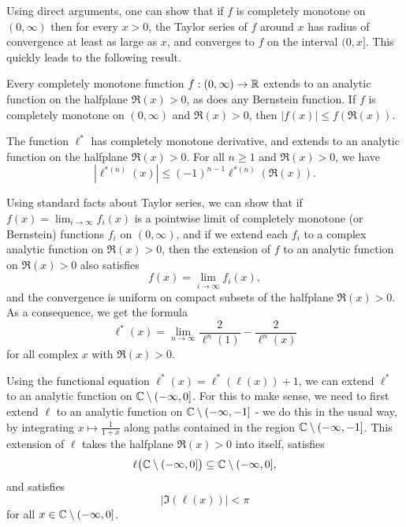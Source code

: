 \documentclass[letterpaper,11pt]{article}
\begin{document}
Using direct arguments, one can show that if $f$ is completely monotone on $(0,\infty)$ then for every $x > 0$, the Taylor series of $f$ around $x$ has radius of convergence at least as large as $x$, and converges to $f$ on the interval $(0,x]$. This quickly leads to the following result.

\begin{prop} Every completely monotone function $f : (0,\infty) \rightarrow \mathbb{R}$ extends to an analytic function on the halfplane $\Re(x) > 0$, as does any Bernstein function. If $f$ is completely monotone on $(0,\infty)$ and $\Re(x) > 0$, then $|f(x)| \le f(\Re(x))$.
\end{prop}

\begin{cor} The function $\ell^*$ has completely monotone derivative, and extends to an analytic function on the halfplane $\Re(x) > 0$. For all $n \ge 1$ and $\Re(x) > 0$, we have
\[
|\ell^{*(n)}(x)| \le (-1)^{n-1}\ell^{*(n)}(\Re(x)).
\]
\end{cor}

Using standard facts about Taylor series, we can show that if $f(x) = \lim_{i\rightarrow \infty} f_i(x)$ is a pointwise limit of completely monotone (or Bernstein) functions $f_i$ on $(0,\infty)$, and if we extend each $f_i$ to a complex analytic function on $\Re(x) > 0$, then the extension of $f$ to an analytic function on $\Re(x) > 0$ also satisfies
\[
f(x) = \lim_{i\rightarrow \infty} f_i(x),
\]
and the convergence is uniform on compact subsets of the halfplane $\Re(x) > 0$. As a consequence, we get the formula
\[
\ell^*(x) = \lim_{n\rightarrow \infty} \frac{2}{\ell^n(1)} - \frac{2}{\ell^n(x)}
\]
for all complex $x$ with $\Re(x) > 0$.

Using the functional equation $\ell^*(x) = \ell^*(\ell(x)) + 1$, we can extend $\ell^*$ to an analytic function on $\mathbb{C} \setminus (-\infty,0]$. For this to make sense, we need to first extend $\ell$ to an analytic function on $\mathbb{C}\setminus(-\infty,-1]$ - we do this in the usual way, by integrating $x \mapsto \frac{1}{1+x}$ along paths contained in the region $\mathbb{C}\setminus(-\infty,-1]$. This extension of $\ell$ takes the halfplane $\Re(x) > 0$ into itself, satisfies
\[
\ell\big(\mathbb{C} \setminus (-\infty,0]\big) \subseteq \mathbb{C} \setminus (-\infty,0],
\]
and satisfies
\[
|\Im(\ell(x))| < \pi
\]
for all $x \in \mathbb{C} \setminus (-\infty,0]$.
\end{document}

